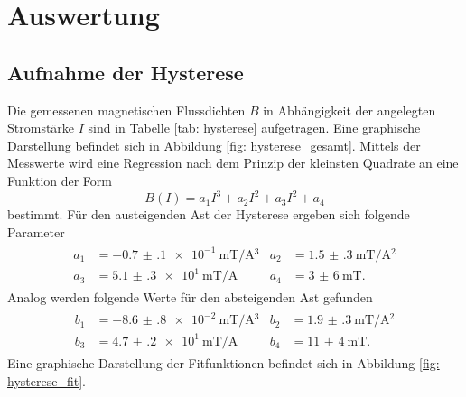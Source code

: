 \section{Auswertung}
\subsection{Aufnahme der Hysterese}
Die gemessenen magnetischen Flussdichten $B$ in Abhängigkeit der angelegten Stromstärke $I$
sind in Tabelle \ref{tab: hysterese} aufgetragen. Eine graphische Darstellung befindet sich in Abbildung
\ref{fig: hysterese_gesamt}. Mittels der Messwerte wird eine Regression nach dem Prinzip der kleinsten Quadrate
an eine Funktion der Form
\begin{equation}
  B(I) = a_1 I^3 + a_2 I^2 + a_3 I ^2 + a_4
  \label{eq: fitfuntion_hysterese}
\end{equation}
bestimmt. Für den austeigenden Ast der Hysterese ergeben sich folgende Parameter
\begin{align}
  \begin{aligned}
    a_1 &= \SI{-0.7(1)e-1}{\milli\tesla \per \ampere ^3} & a_2 &= \SI{1.5(3)}{\milli\tesla \per \ampere ^2} \\
    a_3 &= \SI{5.1(3)e1}{\milli\tesla \per \ampere } & a_4 &= \SI{3(6)}{\milli\tesla }.
    \label{eq: params_up}
  \end{aligned}
\end{align}
Analog werden folgende Werte für den absteigenden Ast gefunden
\begin{align}
  \begin{aligned}
    b_1 &= \SI{-8.6(8)e-2}{\milli\tesla \per \ampere ^3} & b_2 &= \SI{1.9(3)}{\milli\tesla \per \ampere ^2} \\
    b_3 &= \SI{4.7(2)e1}{\milli\tesla \per \ampere } & b_4 &= \SI{11(4)}{\milli\tesla }.
  \end{aligned}
\end{align}
Eine graphische Darstellung der Fitfunktionen befindet sich in Abbildung \ref{fig: hysterese_fit}.

